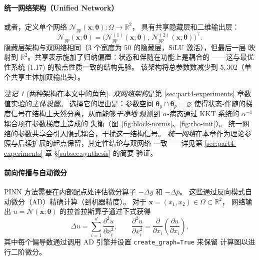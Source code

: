 \documentclass{xmu}
\theoremstyle{plain}
\theoremstyle{remark}
\newtheorem{remark}[theorem]{注记}
\begin{document}
\paragraph{统一网络架构（Unified Network）}
或者，定义单个网络 $\mathcal{N}_{yp}(\mathbf{x};\boldsymbol{\theta}):\Omega\to\mathbb{R}^2$，
具有共享隐藏层和二维输出层：
\begin{equation}
\mathcal{N}_{yp}(\mathbf{x};\boldsymbol{\theta})
= \bigl(\mathcal{N}_{yp}^{(1)}(\mathbf{x};\boldsymbol{\theta}),\,
         \mathcal{N}_{yp}^{(2)}(\mathbf{x};\boldsymbol{\theta})\bigr)^\top.
\end{equation}
隐藏层架构与双网络相同（3 个宽度为 50 的隐藏层，SiLU 激活），但最后一层
映射到 $\mathbb{R}^2$。共享表示施加了归纳偏置：状态和伴随在功能上是耦合的
——这与最优性系统 (1.17) 的鞍点性质一致的结构先验。
该架构将总参数数减少到 $5{,}302$（单个共享主体加双输出头）。

\begin{remark}[两种架构在本文中的角色]
\label{rem:arch-scope}
\emph{双网络架构}是第 \ref{sec:part4-experiments} 章数值实验的\emph{主体设置}。
选择它的理由是：参数空间 $\boldsymbol{\theta}_y\cap\boldsymbol{\theta}_p
=\varnothing$ 使得状态-伴随的梯度信号在结构上天然分离，从而能够\emph{干净地}
观测到 $\alpha$-病态通过 KKT 系统的 $\alpha^{-1}$ 耦合项在参数梯度上造成的
失衡（图~\ref{fig:block-norms}、\ref{fig:rho-init}）。
统一网络的参数共享会引入隐式耦合，干扰这一结构信号。
\emph{统一网络}在本章作为理论参照与后续扩展的起点保留，其定性结论与双网络
一致——详见第 \ref{sec:part4-experiments} 章 §\ref{subsec:synthesis} 的简要
验证。
\end{remark}

\paragraph{前向传播与自动微分}
PINN 方法需要在内部配点处评估微分算子 $-\Delta\bar y$ 和 $-\Delta\bar p$。
这些通过反向模式自动微分（AD）精确计算（到机器精度）\cite{22}。
对于 $\mathbf{x}=(x_1,x_2)\in\Omega\subset\mathbb{R}^2$，
网络输出 $u=\mathcal{N}(\mathbf{x};\boldsymbol{\theta})$ 的拉普拉斯算子通过下式获得
\begin{equation}
\Delta u = \sum_{i=1}^{d}\frac{\partial^2 u}{\partial x_i^2},
\qquad
\frac{\partial^2 u}{\partial x_i^2} = \frac{\partial}{\partial x_i}
\!\left(\frac{\partial u}{\partial x_i}\right),
\end{equation}
其中每个偏导数通过调用 AD 引擎并设置 \texttt{create\_graph=True} 来保留
计算图以进行二阶微分。
\end{document}

